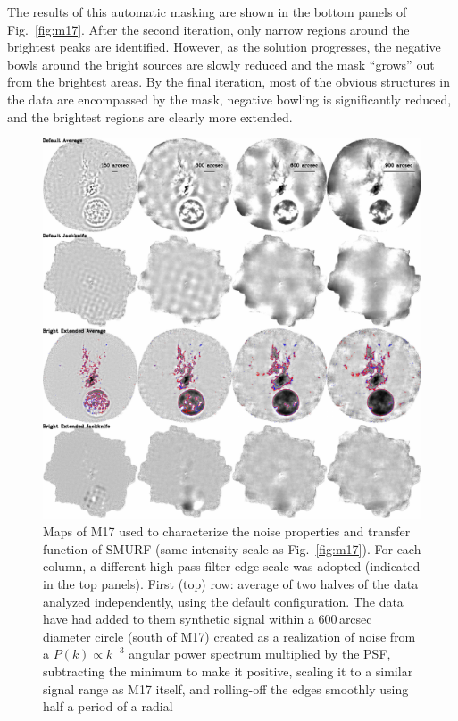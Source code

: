 \documentclass[useAMS,usenatbib,nofootinbib]{mn2e}
\begin{document}
The results of this automatic masking are shown in the bottom panels
of Fig.~\ref{fig:m17}. After the second iteration, only narrow regions
around the brightest peaks are identified. However, as the solution
progresses, the negative bowls around the bright sources are slowly
reduced and the mask ``grows'' out from the brightest areas. By the
final iteration, most of the obvious structures in the data are
encompassed by the mask, negative bowling is significantly reduced,
and the brightest regions are clearly more extended.


\begin{figure}
\centering
\includegraphics[width=\linewidth]{m17_jk.pdf}
\caption{Maps of M17 used to characterize the noise properties and
transfer function of SMURF (same intensity scale as
Fig.~\ref{fig:m17}). For each column, a different high-pass filter
edge scale was adopted (indicated in the top panels). First (top) row:
average of two halves of the data analyzed independently, using the
default configuration. The data have had added to them synthetic
signal within a 600\,arcsec diameter circle (south of M17) created as
a realization of noise from a $P(k) \propto k^{-3}$ angular power
spectrum multiplied by the PSF, subtracting the minimum to make it
positive, scaling it to a similar signal range as M17 itself, and
rolling-off the edges smoothly using half a period of a radial
}
\end{figure}
\end{document}
